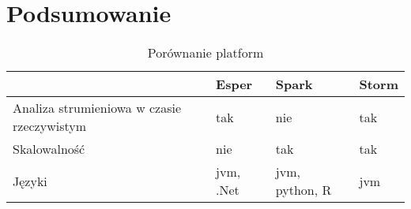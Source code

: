 \section{Podsumowanie}
\begin{table}[h]
  \caption{Porównanie platform}
  \label{stream-summary-table}
  \begin{tabular}{l l l l}
     & Esper & Spark & Storm \\
    \hline
    Analiza strumieniowa w czasie rzeczywistym & tak & nie & tak \\
    Skalowalność & nie & tak & tak \\
    Języki & jvm, .Net & jvm, python, R & jvm \\
  \end{tabular}
\end{table}
